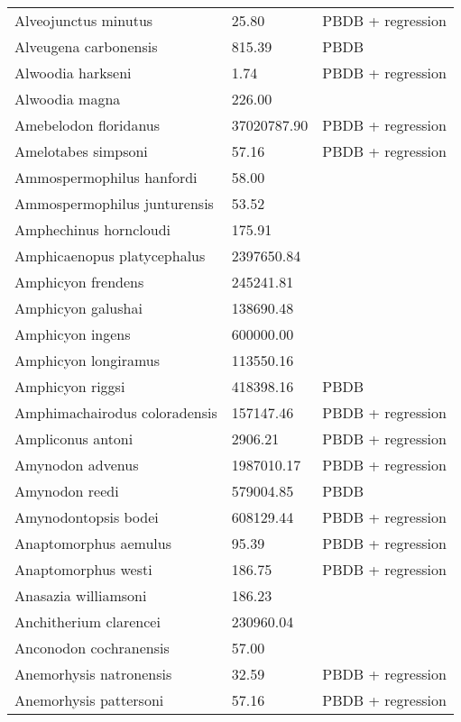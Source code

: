 \documentclass{article}
\begin{document}
\begin{center}
\begin{longtable}{p{} p{} p{}}
    Alveojunctus minutus & 25.80 & PBDB + regression \\ 
    Alveugena carbonensis & 815.39 & PBDB \\ 
    Alwoodia harkseni & 1.74 & PBDB + regression \\ 
    Alwoodia magna & 226.00 & \cite{McKenna2011} \\ 
    Amebelodon floridanus & 37020787.90 & PBDB + regression \\ 
    Amelotabes simpsoni & 57.16 & PBDB + regression \\ 
    Ammospermophilus hanfordi & 58.00 & \cite{McKenna2011} \\ 
    Ammospermophilus junturensis & 53.52 & \cite{Tomiya2013} \\ 
    Amphechinus horncloudi & 175.91 & \cite{Tomiya2013} \\ 
    Amphicaenopus platycephalus & 2397650.84 & \cite{Tomiya2013} \\ 
    Amphicyon frendens & 245241.81 & \cite{Tomiya2013} \\ 
    Amphicyon galushai & 138690.48 & \cite{Tomiya2013} \\ 
    Amphicyon ingens & 600000.00 & \cite{Sorkin2008} \\ 
    Amphicyon longiramus & 113550.16 & \cite{Tomiya2013} \\ 
    Amphicyon riggsi & 418398.16 & PBDB \\ 
    Amphimachairodus coloradensis & 157147.46 & PBDB + regression \\ 
    Ampliconus antoni & 2906.21 & PBDB + regression \\ 
    Amynodon advenus & 1987010.17 & PBDB + regression \\ 
    Amynodon reedi & 579004.85 & PBDB \\ 
    Amynodontopsis bodei & 608129.44 & PBDB + regression \\ 
    Anaptomorphus aemulus & 95.39 & PBDB + regression \\ 
    Anaptomorphus westi & 186.75 & PBDB + regression \\ 
    Anasazia williamsoni & 186.23 & \cite{Williamson2012} \\ 
    Anchitherium clarencei & 230960.04 & \cite{Tomiya2013} \\ 
    Anconodon cochranensis & 57.00 & \cite{Wilson2012} \\ 
    Anemorhysis natronensis & 32.59 & PBDB + regression \\ 
    Anemorhysis pattersoni & 57.16 & PBDB + regression \\ 

\end{longtable}
\end{center}
\end{document}
